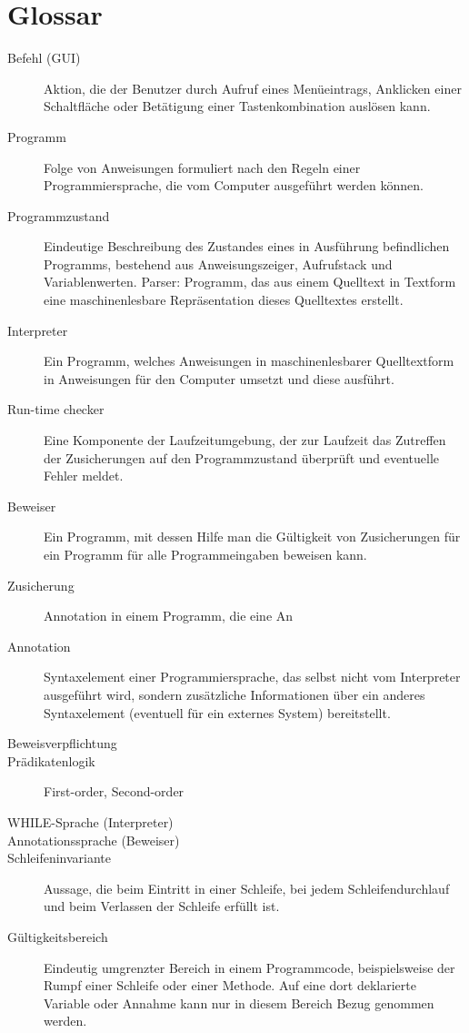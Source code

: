 \section{Glossar}
\begin{description}
    \item[Befehl (GUI)] Aktion, die der Benutzer durch Aufruf eines Menüeintrags, Anklicken einer Schaltfläche oder Betätigung einer Tastenkombination auslösen kann.
    \item[Programm] Folge von Anweisungen formuliert nach den Regeln einer Programmiersprache, die vom Computer ausgeführt werden können.
    \item[Programmzustand] Eindeutige Beschreibung des Zustandes eines in Ausführung befindlichen Programms, bestehend aus Anweisungszeiger, Aufrufstack und Variablenwerten.
    Parser: Programm, das aus einem Quelltext in Textform eine maschinenlesbare Repräsentation dieses Quelltextes erstellt.
    \item[Interpreter] Ein Programm, welches Anweisungen in maschinenlesbarer Quelltextform in Anweisungen für den Computer umsetzt und diese ausführt.
    \item[Run-time checker] Eine Komponente der Laufzeitumgebung, der zur Laufzeit das Zutreffen der Zusicherungen auf den Programmzustand überprüft und eventuelle Fehler meldet.
    \item[Beweiser] Ein Programm, mit dessen Hilfe man die Gültigkeit von Zusicherungen für ein Programm für alle Programmeingaben beweisen kann.
    \item[Zusicherung] Annotation in einem Programm, die eine An
    \item[Annotation] Syntaxelement einer Programmiersprache, das selbst nicht vom Interpreter ausgeführt wird, sondern zusätzliche Informationen über ein anderes Syntaxelement (eventuell für ein externes System) bereitstellt.
    \item[Beweisverpflichtung]
    \item[Prädikatenlogik] First-order, Second-order
    \item[WHILE-Sprache (Interpreter)]
    \item[Annotationssprache (Beweiser)]
    \item[Schleifeninvariante] Aussage, die beim Eintritt in einer Schleife, bei jedem Schleifendurchlauf und beim Verlassen der Schleife erfüllt ist.
    \item[Gültigkeitsbereich] Eindeutig umgrenzter Bereich in einem Programmcode, beispielsweise der Rumpf einer Schleife oder einer Methode. Auf eine dort deklarierte Variable oder Annahme kann nur in diesem Bereich Bezug genommen werden.

\end{description}
